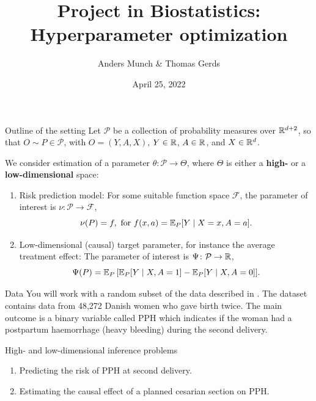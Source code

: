 \documentclass[smaller]{beamer}\usepackage{listings}
\author{Anders Munch \& Thomas Gerds}
\date{April 25, 2022}
\title{Project in Biostatistics: Hyperparameter optimization}
\begin{document}
\maketitle
\begin{frame}[label={sec:org8237656}]{Outline of the setting}
Let $\mathcal{P}$ be a collection of probability measures over $\mathbb{R}^{d+2}$, so that
$O \sim P \in \mathcal{P}$, with $O = (Y, A, X)$, $Y\in \mathbb{R}$, $A\in \mathbb{R}$, and $X \in \mathbb{R}^d$.

\vfill

We consider estimation of a parameter $\theta \colon \mathcal{P} \rightarrow \Theta$, where $\Theta$
is either a \textbf{high-} or a \textbf{low-dimensional} space:

\vfill

\begin{enumerate}
\item Risk prediction model: For some suitable function space \(\mathcal{F}\), the parameter of interest
is \(\nu \colon \mathcal{P} \rightarrow \mathcal{F}\), \[\nu(P) = f, \text{ for } f(x, a) = \operatorname{\mathbb{E}}_P[Y
   \mid X=x, A=a]. \]
\item Low-dimensional (causal) target parameter, for instance the average treatment effect: The
parameter of interest is \(\Psi \colon \mathcal{P} \rightarrow \mathbb{R}\), \[\Psi(P) = \operatorname{\mathbb{E}}_P{\left[ \operatorname{\mathbb{E}}_P[Y
   \mid X, A=1] - \operatorname{\mathbb{E}}_P[Y \mid X, A=0] \right]}. \]
\end{enumerate}
\end{frame}

\begin{frame}[label={sec:org345616e}]{Data}
You will work with a random subset of the data described in \cite{wikkelso2014prediction}. The
dataset contains data from 48,272 Danish women who gave birth twice. The main outcome is a binary
variable called PPH which indicates if the woman had a postpartum haemorrhage (heavy bleeding)
during the second delivery.

\vfill

\begin{block}{High- and low-dimensional inference problems}
\begin{enumerate}
\item Predicting the risk of PPH at second delivery.
\item Estimating the causal effect of a planned cesarian section on PPH.
\end{enumerate}
\end{block}
\end{frame}
\end{document}
